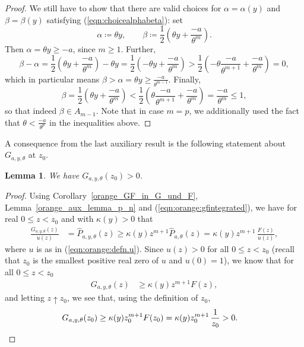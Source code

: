 \documentclass[12pt]{article}
\newcommand{\1}{\mathds{1}}
\theoremstyle{definition}
\theoremstyle{plain}
\newtheorem{Lemma}[definition]{Lemma}
\theoremstyle{remark}
\begin{document}
\begin{proof}
We still have to show that there are valid choices for $\alpha=\alpha(y)$ and $\beta=\beta(y)$ satisfying (\ref{eqn:choicealphabeta}): set 
$$
\alpha\coloneqq \theta y,\qquad \beta\coloneqq \frac{1}{2}\left( \theta y+\frac{-a}{\theta^m}\right).
$$
Then $\alpha=\theta y \geq -a$, since $m\geq 1$. Further,
$$
\beta - \alpha= \frac{1}{2}\left( \theta y+\frac{-a}{\theta^m}\right) - \theta y =\frac{1}{2}\left( -\theta y+\frac{-a}{\theta^m}\right) > \frac{1}{2}\left(-\theta \frac{-a}{\theta^{m+1}}+\frac{-a}{\theta^m}\right) = 0,
$$
which in particular means
$
\beta > \alpha = \theta y \geq \frac{-a}{\theta^{m-1}}
$.
Finally,
$$
\beta = \frac{1}{2}\left( \theta y+\frac{-a}{\theta^m}\right) < \frac{1}{2}\left( \theta \frac{-a}{\theta^{m+1}}+\frac{-a}{\theta^m}\right) = \frac{-a}{\theta^m} \leq 1,
$$
so that indeed $\beta\in A_{m-1}$. Note that in case $m=p$, we additionally used the fact that $\theta<\frac{-a}{\theta^p}$ in the inequalities above.
\end{proof}


A consequence from the last auxiliary result is the following statement about $G_{a,y,\theta}$ at $z_0$.

\begin{Lemma} \label{lem:gofz0positive}
    We have $G_{a,y,\theta}(z_0)>0$.
\end{Lemma}

\begin{proof}
Using Corollary~\ref{orange_GF_in_G_und_F}, Lemma~\ref{orange_aux_lemma_p_n} and (\ref{eqn:orange:gfintegrated}), we have for real $0\leq z<z_0$ and with  $\kappa(y)>0$ that
\begin{align*} 
\frac{G_{a,y,\theta}(z)}{u(z)}
& = \hat P_{a,y,\theta}(z)
 \geq \kappa(y) z^{m+1} \hat P_{a,\theta}(z)
 =\kappa(y) z^{m+1} \, \frac{F(z)}{u(z)},
\end{align*}
where $u$ is as in (\ref{eqn:orange:defn.u}).
Since $u(z)>0$ for all $0\leq z<z_0$ (recall that $z_0$ is the smallest positive real zero of $u$ and $u(0)=1$), we know that for all $0\leq z <z_0$
\begin{align*} 
 G_{a,y,\theta}(z)
& \geq  \kappa(y) z^{m+1}F(z),
\end{align*}
and letting $z\uparrow z_0$, we see that, using the definition of $z_0$,
\begin{align*} 
 G_{a,y,\theta}(z_0)
& \geq  \kappa(y) z_0^{m+1}F(z_0) =  \kappa(y) z_0^{m+1}\, \frac{1}{z_0} > 0. \qedhere
\end{align*}
 \end{proof}
\end{document}

